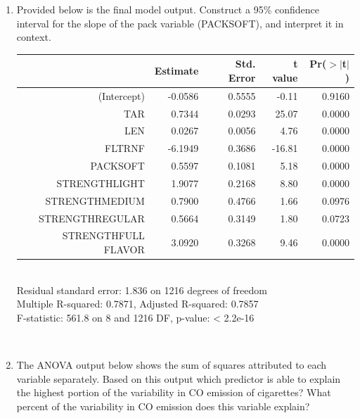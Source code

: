 \documentclass[11pt]{article}
\newcommand{\soln}[2]{$\:$\\ \vspace{#1}}{}
\begin{document}
\pagebreak

\begin{enumerate}[resume]

\item Provided below is the final model output. Construct a 95\% confidence interval for the slope of 
the pack variable (PACKSOFT), and interpret it in context.

\begin{minipage}[c]{0.55\textwidth}
{\footnotesize
\begin{tabular}{rrrrr}
  \hline
 & Estimate & Std. Error & t value & Pr($>$$|$t$|$) \\ 
  \hline
(Intercept) & -0.0586 & 0.5555 & -0.11 & 0.9160 \\ 
  TAR & 0.7344 & 0.0293 & 25.07 & 0.0000 \\ 
  LEN & 0.0267 & 0.0056 & 4.76 & 0.0000 \\ 
  FLTRNF & -6.1949 & 0.3686 & -16.81 & 0.0000 \\ 
  PACKSOFT & 0.5597 & 0.1081 & 5.18 & 0.0000 \\ 
  STRENGTHLIGHT & 1.9077 & 0.2168 & 8.80 & 0.0000 \\ 
  STRENGTHMEDIUM & 0.7900 & 0.4766 & 1.66 & 0.0976 \\ 
  STRENGTHREGULAR & 0.5664 & 0.3149 & 1.80 & 0.0723 \\ 
  STRENGTHFULL FLAVOR & 3.0920 & 0.3268 & 9.46 & 0.0000 \\ 
   \hline
\end{tabular}
$\:$ \\
Residual standard error: 1.836 on 1216 degrees of freedom \\
Multiple R-squared:  0.7871,	Adjusted R-squared:  0.7857 \\
F-statistic: 561.8 on 8 and 1216 DF,  p-value: < 2.2e-16 \\
}
\end{minipage}
\begin{minipage}[c]{0.4\textwidth}
\soln{3cm}{
$df = 1216$, $t_{1216}^\star \approx 1.96$ \\
$0.5597 \pm 1.96 \times 0.1081 = (0.35, 0.77)$ \\
We are 95\% confident that, on average, soft pack cigarettes emit 0.35 mg to 0.77 mg more CO than hard pack cigarettes.
}
\end{minipage}

%

\item The ANOVA output below shows the sum of squares attributed to each variable separately. Based on this output
which predictor is able to explain the highest portion of the variability in CO emission of cigarettes? What percent
of the variability in CO emission does this variable explain?


\end{enumerate}
\end{document}
